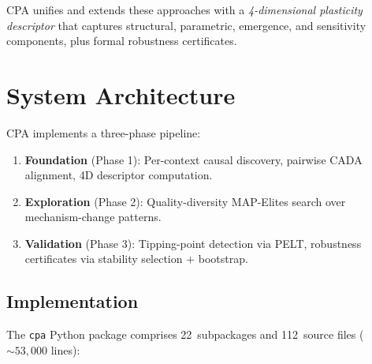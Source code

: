 \documentclass[11pt]{article}
\newcommand{\cpa}{\textsc{CPA}}
\begin{document}
\cpa{} unifies and extends these approaches with a \emph{4-dimensional
plasticity descriptor} that captures structural, parametric, emergence,
and sensitivity components, plus formal robustness certificates.

\section{System Architecture}

\cpa{} implements a three-phase pipeline:

\begin{enumerate}[nosep]
  \item \textbf{Foundation} (Phase 1): Per-context causal discovery,
    pairwise CADA alignment, 4D descriptor computation.
  \item \textbf{Exploration} (Phase 2): Quality-diversity MAP-Elites
    search over mechanism-change patterns.
  \item \textbf{Validation} (Phase 3): Tipping-point detection via
    PELT, robustness certificates via stability selection + bootstrap.
\end{enumerate}

\subsection{Implementation}

The \texttt{cpa} Python package comprises 22~subpackages and
112~source files (${\sim}53{,}000$ lines):
\end{document}

